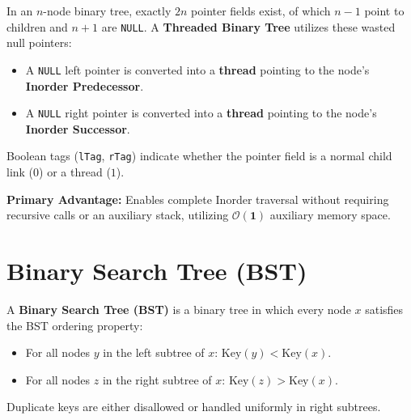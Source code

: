 \documentclass[12pt,a4paper]{article}
\begin{document}
\begin{tcolorbox}[defbox, title={\textbf{Definition: Threaded Binary Tree}}]
In an $n$-node binary tree, exactly $2n$ pointer fields exist, of which $n-1$ point to children and $n+1$ are \texttt{NULL}. A \textbf{Threaded Binary Tree} utilizes these wasted null pointers:
\begin{itemize}[leftmargin=*, nosep]
  \item A \texttt{NULL} left pointer is converted into a \textbf{thread} pointing to the node's \textbf{Inorder Predecessor}.
  \item A \texttt{NULL} right pointer is converted into a \textbf{thread} pointing to the node's \textbf{Inorder Successor}.
\end{itemize}
Boolean tags (\texttt{lTag}, \texttt{rTag}) indicate whether the pointer field is a normal child link ($0$) or a thread ($1$).
\end{tcolorbox}

\textbf{Primary Advantage:} Enables complete Inorder traversal without requiring recursive calls or an auxiliary stack, utilizing $\mathbf{\mathcal{O}(1)}$ auxiliary memory space.

\section{Binary Search Tree (BST)}

\begin{tcolorbox}[defbox, title={\textbf{Definition: Binary Search Tree (BST) Invariant}}]
A \textbf{Binary Search Tree (BST)} is a binary tree in which every node $x$ satisfies the BST ordering property:
\begin{itemize}[leftmargin=*, nosep]
  \item For all nodes $y$ in the left subtree of $x$: $\text{Key}(y) < \text{Key}(x)$.
  \item For all nodes $z$ in the right subtree of $x$: $\text{Key}(z) > \text{Key}(x)$.
\end{itemize}
Duplicate keys are either disallowed or handled uniformly in right subtrees.
\end{tcolorbox}
\end{document}
